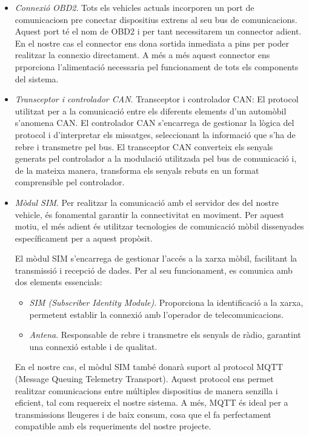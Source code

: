 \documentclass{tfgitic}[2024/07/01]
\begin{document}
\begin{itemize}
  \item \emph{Connexió OBD2}. Tots els vehicles actuals incorporen un port de comunicaciosn pre conectar dispositius extrens al seu bus de comunicacions. Aquest port té el 
  nom de OBD2 i per tant necessitarem un connector adient. En el nostre cas el connector ens dona sortida inmediata a pins per poder realitzar la connexio directament. 
  A més a més aquest connector ens prporciona l’alimentació necessaria pel funcionament de tots els components del sistema.
  
  \item \emph{Transceptor i controlador CAN}. Transceptor i controlador CAN: El protocol utilitzat per a la comunicació entre els diferents elements d’un automòbil s’anomena CAN. 
  El controlador CAN s’encarrega de gestionar la lògica del protocol i d’interpretar els missatges, seleccionant la informació que s’ha de rebre i transmetre pel bus. El transceptor 
  CAN converteix els senyals generats pel controlador a la modulació utilitzada pel bus de comunicació i, de la mateixa manera, transforma els senyals rebuts en un format comprensible 
  pel controlador.
  
  \item \emph{Mòdul SIM}. Per realitzar la comunicació amb el servidor des del nostre vehicle, és fonamental garantir la connectivitat en moviment. Per aquest motiu, 
  el més adient és utilitzar tecnologies de comunicació mòbil dissenyades específicament per a aquest propòsit.

  El mòdul SIM s'encarrega de gestionar l'accés a la xarxa mòbil, facilitant la transmissió i recepció de dades. Per al seu funcionament, 
  es comunica amb dos elements essencials:  

  \begin{itemize}
    \item \emph{SIM (Subscriber Identity Module)}. Proporciona la identificació a la xarxa, permetent establir la connexió amb l’operador de telecomunicacions.
    \item \emph{Antena}. Responsable de rebre i transmetre els senyals de ràdio, garantint una connexió estable i de qualitat.
  \end{itemize} 

  En el nostre cas, el mòdul SIM també donarà suport al protocol MQTT (Message Queuing Telemetry Transport). Aquest protocol ens permet realitzar 
  comunicacions entre múltiples dispositius de manera senzilla i eficient, tal com requereix el nostre sistema. A més, MQTT és ideal per a transmissions 
  lleugeres i de baix consum, cosa que el fa perfectament compatible amb els requeriments del nostre projecte.


\end{itemize}
\end{document}
